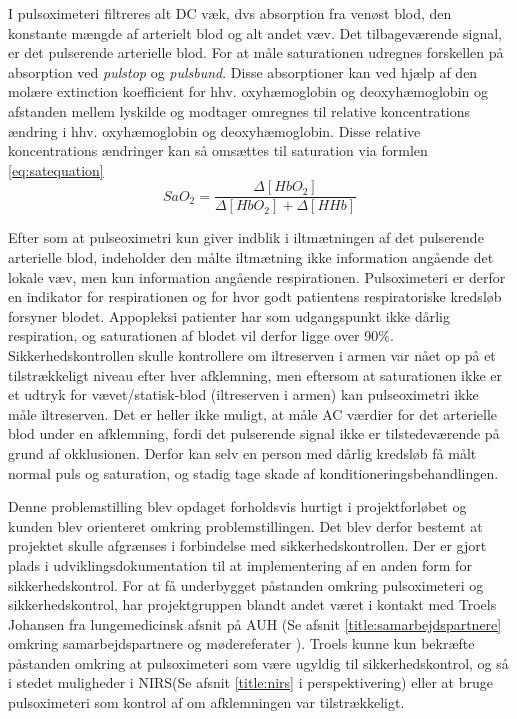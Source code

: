 I pulsoximeteri filtreres alt DC væk, dvs absorption fra venøst blod, den konstante mængde af arterielt blod og alt andet væv. Det tilbageværende signal, er det pulserende arterielle blod. For at måle saturationen udregnes forskellen på absorption ved \textit{pulstop} og \textit{pulsbund}. Disse absorptioner kan ved hjælp af den molære extinction koefficient for hhv. oxyhæmoglobin og deoxyhæmoglobin og afstanden mellem lyskilde og modtager omregnes til relative koncentrations ændring i hhv. oxyhæmoglobin og deoxyhæmoglobin. Disse relative koncentrations ændringer kan så omsættes til saturation via formlen \ref{eq:satequation}
\begin{equation}
	SaO_2 = \frac{\Delta[HbO_2]}{\Delta[HbO_2]+\Delta[HHb]}
	\label{eq:satequation}
\end{equation}

Efter som at pulseoximetri kun giver indblik i iltmætningen af det pulserende arterielle blod, indeholder den målte iltmætning ikke information angående det lokale væv, men kun information angående respirationen. Pulsoximeteri er derfor en indikator for respirationen og for hvor godt patientens respiratoriske kredsløb forsyner blodet. Appopleksi patienter har som udgangspunkt ikke dårlig respiration, og saturationen af blodet vil derfor ligge over 90\%. Sikkerhedskontrollen skulle kontrollere om iltreserven i armen var nået op på et tilstrækkeligt niveau efter hver afklemning, men eftersom at saturationen ikke er et udtryk for vævet/statisk-blod (iltreserven i armen) kan pulseoximetri ikke måle iltreserven.
Det er heller ikke muligt, at måle AC værdier for det arterielle blod under en afklemning, fordi det pulserende signal ikke er tilstedeværende på grund af okklusionen. Derfor kan selv en person med dårlig kredsløb få målt normal puls og saturation, og stadig tage skade af konditioneringsbehandlingen. 

Denne problemstilling blev opdaget forholdsvis hurtigt i projektforløbet og kunden blev orienteret omkring problemstillingen. Det blev derfor bestemt at projektet skulle afgrænses i forbindelse med sikkerhedskontrollen. Der er gjort plads i udviklingsdokumentation til at implementering af en anden form for sikkerhedskontrol. For at få underbygget påstanden omkring pulsoximeteri og sikkerhedskontrol, har projektgruppen blandt andet været i kontakt med Troels Johansen fra lungemedicinsk afsnit på AUH (Se afsnit \ref{title:samarbejdspartnere} omkring samarbejdspartnere og mødereferater ). Troels kunne kun bekræfte påstanden omkring at pulsoximeteri som være ugyldig til sikkerhedskontrol, og så i stedet muligheder i NIRS(Se afsnit \ref{title:nirs} i perspektivering) eller at bruge pulsoximeteri som kontrol af om afklemningen var tilstrækkeligt. 

